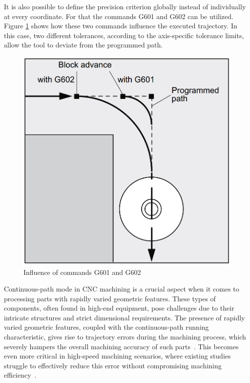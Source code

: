 It is also possible to define the precision criterion globally instead of individually at every coordinate. For that the commands G601 and G602 can be utilized. Figure \ref{C4} shows how these two commands influence the executed trajectory. In this case, two different tolerances, according to the axis-specific tolerance limits, allow the tool to deviate from the programmed path.
 
\begin{figure}[H]
 	\centerline{\includegraphics[scale=.3]{figures/conti3.png}}
 	\caption{Influence of commands G601 and G602~\cite{sinumericmanual}}
 	\label{C4}
\end{figure}
 
Continuous-path mode in \acrshort{CNC} machining is a crucial aspect when it comes to processing parts with rapidly varied geometric features. These types of components, often found in high-end equipment, pose challenges due to their intricate structures and strict dimensional requirements. The presence of rapidly varied geometric features, coupled with the continuous-path running characteristic, gives rise to trajectory errors during the machining process, which severely hampers the overall machining accuracy of such parts~\cite{Shahzadeh.2018}. This becomes even more critical in high-speed machining scenarios, where existing studies struggle to effectively reduce this error without compromising machining efficiency~\cite{Li.2018}.

